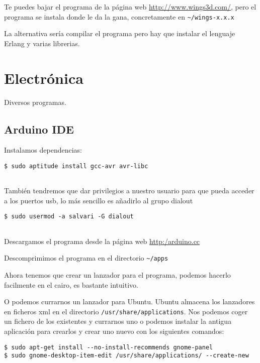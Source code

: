 Te puedes bajar el programa de la página web
\url{http://www.wings3d.com/}, pero el programa se instala donde le da
la gana, concretamente en \texttt{\textasciitilde{}/wings-x.x.x}

La alternativa sería compilar el programa pero hay que instalar el
lenguaje Erlang y varias librerias.

\section{Electrónica}\label{electruxf3nica}

Diversos programas.

\subsection{Arduino IDE}\label{arduino-ide}

Instalamos dependencias:

\begin{verbatim}
$ sudo aptitude install gcc-avr avr-libc
      
\end{verbatim}

También tendremos que dar privilegios a nuestro usuario para que pueda
acceder a los puertos usb, lo más sencillo es añadirlo al grupo dialout

\begin{verbatim}
$ sudo usermod -a salvari -G dialout
      
\end{verbatim}

Descargamos el programa desde la página web \url{http:/arduino.cc}

Descomprimimos el programa en el directorio
\texttt{\textasciitilde{}/apps}

Ahora tenemos que crear un lanzador para el programa, podemos hacerlo
facilmente en el cairo, es bastante intuitivo.

O podemos currarnos un lanzador para Ubuntu. Ubuntu almacena los
lanzadores en ficheros xml en el directorio
\texttt{/usr/share/applications}. Nos podemos coger un fichero de los
existentes y currarnos uno o podemos instalar la antigua aplicación para
crearlos y crear uno nuevo con los siguientes comandos:

\begin{verbatim}
$ sudo apt-get install --no-install-recommends gnome-panel
$ sudo gnome-desktop-item-edit /usr/share/applications/ --create-new
      
\end{verbatim}

